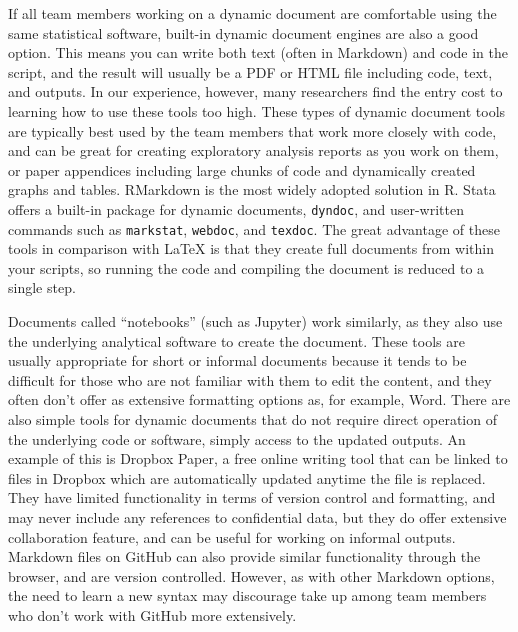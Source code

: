 If all team members working on a dynamic document are comfortable using the same statistical software,
built-in dynamic document engines are also a good option.
This means you can write both text (often in Markdown) and code in the script,
and the result will usually be a PDF or HTML file including code, text, and outputs.
In our experience, however, many researchers find the entry cost to learning how to use these tools too high.
These types of dynamic document tools are typically best used by the team members that work more closely with code,
and can be great for creating exploratory analysis reports as you work on them, 
or paper appendices including large chunks of code and dynamically created graphs and tables.
RMarkdown is the most widely adopted solution in R.
Stata offers a built-in package for dynamic documents, \texttt{dyndoc}, 
and user-written commands such as \texttt{markstat},
\texttt{webdoc}, and
\texttt{texdoc}.
The great advantage of these tools in comparison with LaTeX is that 
they create full documents from within your scripts, 
so running the code and compiling the document is reduced to a single step.

Documents called ``notebooks'' (such as Jupyter) work similarly,
as they also use the underlying analytical software to create the document.
These tools are usually appropriate for short or informal documents
because it tends to be difficult for those who are not familiar with them to edit the content,
and they often don't offer as extensive formatting options as, for example, Word.
There are also simple tools for dynamic documents
that do not require direct operation of the underlying code or software,
simply access to the updated outputs.
An example of this is Dropbox Paper,
a free online writing tool that can be linked to files in Dropbox
which are automatically updated anytime the file is replaced.
They have limited functionality in terms of version control and formatting,
and may never include any references to confidential data,
but they do offer extensive collaboration feature, 
and can be useful for working on informal outputs. 
Markdown files on GitHub can also provide similar functionality through the browser,
and are version controlled.
However, as with other Markdown options, the need to learn a new syntax may
discourage take up among team members who don't work with GitHub more extensively.

